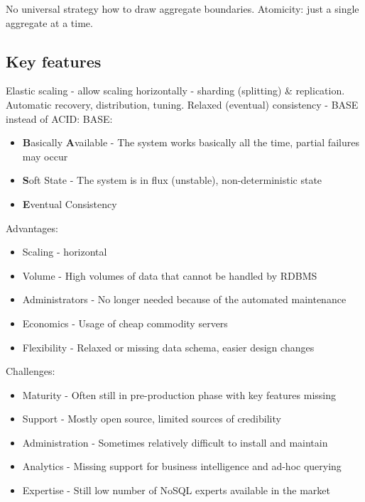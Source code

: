 No universal strategy how to draw aggregate boundaries. Atomicity: just a single aggregate at a time.

\subsection{Key features}
Elastic scaling - allow scaling horizontally - sharding (splitting) \& replication. Automatic recovery, distribution, tuning. Relaxed (eventual) consistency - BASE instead of ACID:
\newline\newline
BASE:
\begin{itemize}
    \item \textbf{B}asically \textbf{A}vailable - The system works basically all the time, partial failures may occur
    \item \textbf{S}oft State - The system is in flux (unstable), non-deterministic state
    \item \textbf{E}ventual Consistency
\end{itemize}


Advantages:
\begin{itemize}
    \item Scaling - horizontal
    \item Volume - High volumes of data that cannot be handled by RDBMS
    \item Administrators - No longer needed because of the automated maintenance
    \item Economics - Usage of cheap commodity servers
    \item Flexibility - Relaxed or missing data schema, easier design changes
\end{itemize}


Challenges:
\begin{itemize}
    \item Maturity - Often still in pre-production phase with key features missing
    \item Support - Mostly open source, limited sources of credibility
    \item Administration - Sometimes relatively difficult to install and maintain
    \item Analytics  - Missing support for business intelligence and ad-hoc querying
    \item Expertise - Still low number of NoSQL experts available in the market
\end{itemize}

